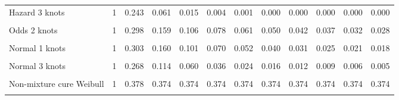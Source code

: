 \documentclass[
]{article}
\begin{document}
\begin{table}[H]
{\begin{tabular}[t]{lrrrrrrrrrrr}
Hazard 3 knots & 1 & 0.243 & 0.061 & 0.015 & 0.004 & 0.001 & 0.000 & 0.000 & 0.000 & 0.000 & 0.000\\
\cellcolor{gray!10}{Odds 1 knots} & \cellcolor{gray!10}{1} & \cellcolor{gray!10}{0.320} & \cellcolor{gray!10}{0.190} & \cellcolor{gray!10}{0.135} & \cellcolor{gray!10}{0.104} & \cellcolor{gray!10}{0.085} & \cellcolor{gray!10}{0.072} & \cellcolor{gray!10}{0.062} & \cellcolor{gray!10}{0.055} & \cellcolor{gray!10}{0.049} & \cellcolor{gray!10}{0.044}\\
Odds 2 knots & 1 & 0.298 & 0.159 & 0.106 & 0.078 & 0.061 & 0.050 & 0.042 & 0.037 & 0.032 & 0.028\\
\cellcolor{gray!10}{Odds 3 knots} & \cellcolor{gray!10}{1} & \cellcolor{gray!10}{0.272} & \cellcolor{gray!10}{0.127} & \cellcolor{gray!10}{0.078} & \cellcolor{gray!10}{0.054} & \cellcolor{gray!10}{0.040} & \cellcolor{gray!10}{0.032} & \cellcolor{gray!10}{0.026} & \cellcolor{gray!10}{0.022} & \cellcolor{gray!10}{0.019} & \cellcolor{gray!10}{0.016}\\
Normal 1 knots & 1 & 0.303 & 0.160 & 0.101 & 0.070 & 0.052 & 0.040 & 0.031 & 0.025 & 0.021 & 0.018\\
\cellcolor{gray!10}{Normal 2 knots} & \cellcolor{gray!10}{1} & \cellcolor{gray!10}{0.299} & \cellcolor{gray!10}{0.154} & \cellcolor{gray!10}{0.096} & \cellcolor{gray!10}{0.065} & \cellcolor{gray!10}{0.047} & \cellcolor{gray!10}{0.036} & \cellcolor{gray!10}{0.028} & \cellcolor{gray!10}{0.023} & \cellcolor{gray!10}{0.018} & \cellcolor{gray!10}{0.015}\\
Normal 3 knots & 1 & 0.268 & 0.114 & 0.060 & 0.036 & 0.024 & 0.016 & 0.012 & 0.009 & 0.006 & 0.005\\
\cellcolor{gray!10}{Mixture cure Weibull} & \cellcolor{gray!10}{1} & \cellcolor{gray!10}{0.386} & \cellcolor{gray!10}{0.384} & \cellcolor{gray!10}{0.384} & \cellcolor{gray!10}{0.384} & \cellcolor{gray!10}{0.384} & \cellcolor{gray!10}{0.384} & \cellcolor{gray!10}{0.384} & \cellcolor{gray!10}{0.384} & \cellcolor{gray!10}{0.384} & \cellcolor{gray!10}{0.384}\\
Non-mixture cure Weibull & 1 & 0.378 & 0.374 & 0.374 & 0.374 & 0.374 & 0.374 & 0.374 & 0.374 & 0.374 & 0.374\\
\cellcolor{gray!10}{Mixture cure Log-normal} & \cellcolor{gray!10}{1} & \cellcolor{gray!10}{0.343} & \cellcolor{gray!10}{0.291} & \cellcolor{gray!10}{0.282} & \cellcolor{gray!10}{0.279} & \cellcolor{gray!10}{0.279} & \cellcolor{gray!10}{0.278} & \cellcolor{gray!10}{0.278} & \cellcolor{gray!10}{0.278} & \cellcolor{gray!10}{0.278} & \cellcolor{gray!10}{0.278}\\

\end{tabular}}
\end{table}
\end{document}
